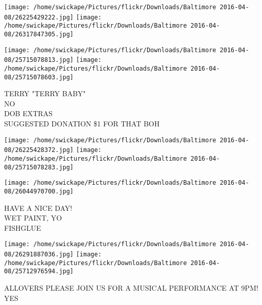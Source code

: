 \documentclass[10pt,letterpaper]{article}
\begin{document}
\texttt{[image: /home/swickape/Pictures/flickr/Downloads/Baltimore 2016-04-08/26225429222.jpg]}
\texttt{[image: /home/swickape/Pictures/flickr/Downloads/Baltimore 2016-04-08/26317847305.jpg]}

\texttt{[image: /home/swickape/Pictures/flickr/Downloads/Baltimore 2016-04-08/25715078813.jpg]}
\texttt{[image: /home/swickape/Pictures/flickr/Downloads/Baltimore 2016-04-08/25715078603.jpg]}

TERRY "TERRY BABY"\\
NO\\
DOB EXTRAS\\
SUGGESTED DONATION \$1 FOR THAT BOH\\
\pagebreak

\texttt{[image: /home/swickape/Pictures/flickr/Downloads/Baltimore 2016-04-08/26225428372.jpg]}
\texttt{[image: /home/swickape/Pictures/flickr/Downloads/Baltimore 2016-04-08/25715078283.jpg]}

\vspace{0.25in}
\texttt{[image: /home/swickape/Pictures/flickr/Downloads/Baltimore 2016-04-08/26044970700.jpg]}

HAVE A NICE DAY!\\
WET PAINT, YO\\
FISHGLUE\\
\pagebreak

\texttt{[image: /home/swickape/Pictures/flickr/Downloads/Baltimore 2016-04-08/26291887036.jpg]}
\texttt{[image: /home/swickape/Pictures/flickr/Downloads/Baltimore 2016-04-08/25712976594.jpg]}

ALLOVERS PLEASE JOIN US FOR A MUSICAL PERFORMANCE AT 9PM!\\
YES\\
\pagebreak
\end{document}
